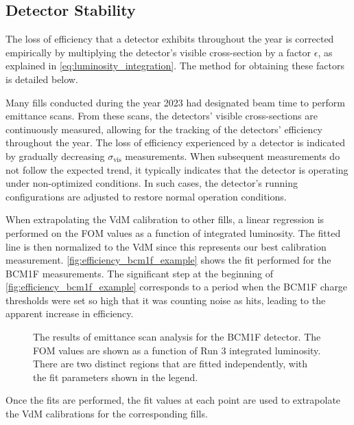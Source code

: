 \subsection{Detector Stability}

The loss of efficiency that a detector exhibits throughout the year is corrected empirically by multiplying the detector's visible cross-section by a factor \(\epsilon\), as explained in \autoref{eq:luminosity_integration}. The method for obtaining these factors is detailed below.

Many fills conducted during the year 2023 had designated beam time to perform emittance scans. From these scans, the detectors' visible cross-sections are continuously measured, allowing for the tracking of the detectors' efficiency throughout the year. The loss of efficiency experienced by a detector is indicated by gradually decreasing \(\sigma_{\mathrm{vis}}\) measurements. When subsequent measurements do not follow the expected trend, it typically indicates that the detector is operating under non-optimized conditions. In such cases, the detector's running configurations are adjusted to restore normal operation conditions.

When extrapolating the VdM calibration to other fills, a linear regression is performed on the FOM values as a function of integrated luminosity. The fitted line is then normalized to the VdM since this represents our best calibration measurement. \autoref{fig:efficiency_bcm1f_example} shows the fit performed for the BCM1F measurements. The significant step at the beginning of \autoref{fig:efficiency_bcm1f_example} corresponds to a period when the BCM1F charge thresholds were set so high that it was counting noise as hits, leading to the apparent increase in efficiency.

\begin{figure}[!htb]
	\centering
	\caption[BCM1F efficiency analysis results]{The results of emittance scan analysis for the BCM1F detector. The FOM values are shown as a function of Run 3 integrated luminosity. There are two distinct regions that are fitted independently, with the fit parameters shown in the legend.}
	\label{fig:efficiency_bcm1f_example}
\end{figure}

Once the fits are performed, the fit values at each point are used to extrapolate the VdM calibrations for the corresponding fills.


